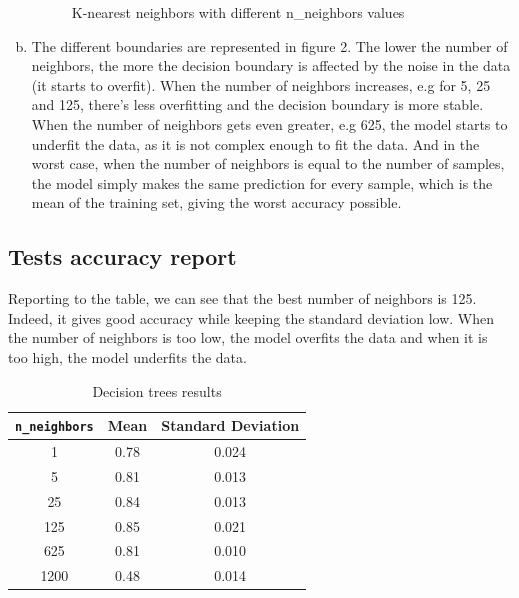 \documentclass[12pt]{article}
\begin{document}
\begin{enumerate}[a)]
\begin{figure}[H]
			\caption{K-nearest neighbors with different n\_neighbors values}
			\label{fig:knn}
		\end{figure}
		\item 
		The different boundaries are represented in figure 2. The lower the number of neighbors, the more the decision boundary is affected by the noise in the data (it starts to overfit). 
		When the number of neighbors increases, e.g for 5, 25 and 125, there's less overfitting and the decision boundary is more stable.
		When the number of neighbors gets even greater, e.g 625, the model starts to underfit the data, as it is not complex enough to fit the data.
		And in the worst case, when the number of neighbors is equal to the number of samples, the model simply makes the same prediction for every sample, which is the mean of the training set, giving the worst accuracy possible.
	\end{enumerate}
\subsection{Tests accuracy report}
Reporting to the table, we can see that the best number of neighbors is 125. 
Indeed, it gives good accuracy while keeping the standard deviation low. 
When the number of neighbors is too low, the model overfits the data and when it is too high, the model underfits the data.
	\begin{table}[H]
		\centering
		\begin{tabular}{|c|c|c|}
		\hline
		\verb|n_neighbors|               & Mean & Standard Deviation \\ \hline
		1                                & 0.78 & 0.024              \\ \hline
		5                                & 0.81 & 0.013              \\ \hline
		25                               & 0.84 & 0.013              \\ \hline
		125                              & 0.85 & 0.021              \\ \hline
		625                              & 0.81 & 0.010              \\ \hline
		1200                             & 0.48 & 0.014              \\ \hline

		\end{tabular}
		\caption{Decision trees results}
		\label{tab:results-knn}
	\end{table}
\end{document}
